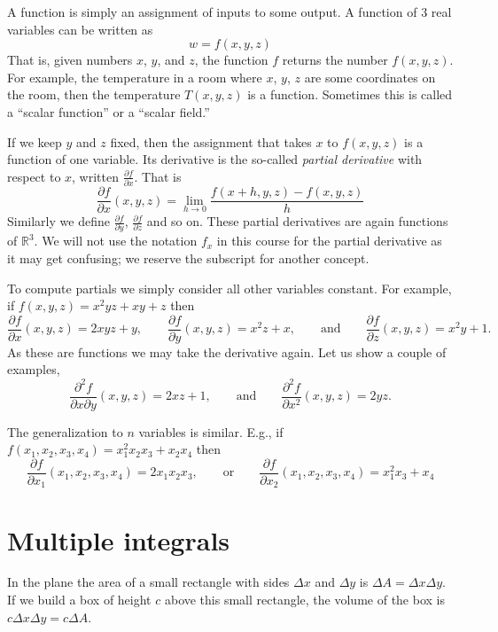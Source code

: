 \documentclass[11pt]{article}
\newcommand{\R}{{\mathbb{R}}}
\begin{document}
A function is simply an assignment of inputs to some output.
A function of 3 real variables can be written as
$$
w = f(x,y,z)
$$
That is, given numbers $x$, $y$, and $z$, the function $f$ returns the number $f(x,y,z)$.
For example, the temperature in a room where $x$, $y$, $z$ are some coordinates on the room,
then the temperature $T(x,y,z)$ is a function.  Sometimes this is called a
``scalar function'' or a ``scalar field.''

If we keep $y$ and $z$ fixed, then the assignment that takes $x$ to $f(x,y,z)$ is a
function of one variable.
Its derivative is the so-called \emph{partial derivative} with respect to $x$,
written $\frac{\partial f}{\partial x}$.  That is
$$
\frac{\partial f}{\partial x}(x,y,z) = \lim_{h\to 0} \frac{f(x+h,y,z)-f(x,y,z)}{h}
$$
Similarly we define
$\frac{\partial f}{\partial y}$,
$\frac{\partial f}{\partial z}$ and so on.  These partial derivatives are again
functions of $\R^3$.
We will not use the notation $f_x$ in this
course for the partial derivative as
it may get confusing;
we reserve the subscript for another concept.

To compute partials we simply consider all other variables constant.
For example, if $f(x,y,z) = x^2yz + xy + z$ then
$$
\frac{\partial f}{\partial x}(x,y,z) = 2xyz + y,
\qquad
\frac{\partial f}{\partial y}(x,y,z) = x^2z + x,
\qquad \text{and} \qquad
\frac{\partial f}{\partial z}(x,y,z) = x^2y + 1 .
$$
As these are functions we may take the derivative again.  Let us show a couple of examples,
$$
\frac{\partial^2 f}{\partial x \partial y}(x,y,z) = 2xz + 1,
\qquad \text{and} \qquad
\frac{\partial^2 f}{\partial x^2}(x,y,z) = 2yz .
$$

The generalization to $n$ variables is similar.  E.g.,
if $f(x_1,x_2,x_3,x_4) = x_1^2x_2x_3 + x_2 x_4$ then
$$
\frac{\partial f}{\partial x_1}(x_1,x_2,x_3,x_4) = 2x_1 x_2 x_3,
\qquad \text{or} \qquad
\frac{\partial f}{\partial x_2}(x_1,x_2,x_3,x_4) = x_1^2 x_3 + x_4
$$

\section{Multiple integrals}

In the plane the area of a small rectangle with sides $\Delta x$ and $\Delta y$
is $\Delta A = \Delta x \Delta y$.
If we build a box of height $c$ above
this small rectangle, the volume of the box is $c \Delta x \Delta y = c \Delta A$.
\end{document}
